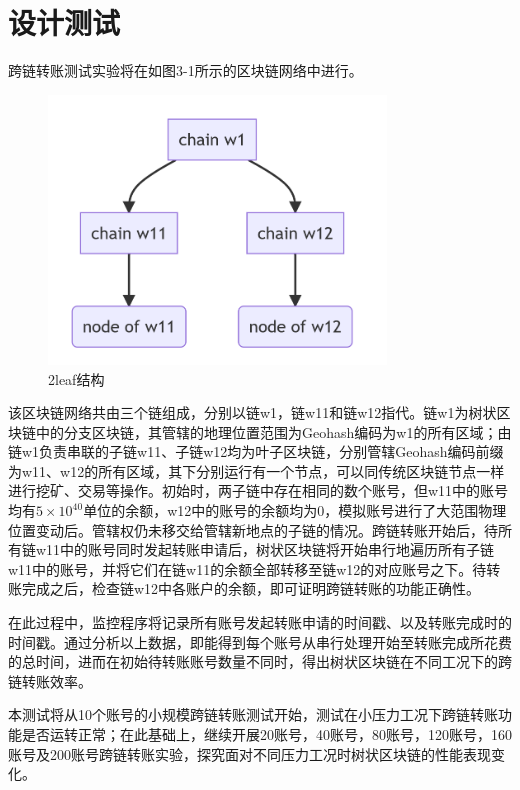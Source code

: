 \section{设计测试}

跨链转账测试实验将在如图3-1所示的区块链网络中进行。

\begin{figure}[htbp]
    \centering
    \includegraphics[width=0.8\textwidth]{images/2leaf-structure.png}
    \caption{2leaf结构}\label{2leaf结构} %
\end{figure}

该区块链网络共由三个链组成，分别以链w1，链w11和链w12指代。链w1为树状区块链中的分支区块链，其管辖的地理位置范围为Geohash编码为w1的所有区域；由链w1负责串联的子链w11、子链w12均为叶子区块链，分别管辖Geohash编码前缀为w11、w12的所有区域，其下分别运行有一个节点，可以同传统区块链节点一样进行挖矿、交易等操作。初始时，两子链中存在相同的数个账号，但w11中的账号均有$5 \times 10^{40}$单位的余额，w12中的账号的余额均为0，模拟账号进行了大范围物理位置变动后。管辖权仍未移交给管辖新地点的子链的情况。跨链转账开始后，待所有链w11中的账号同时发起转账申请后，树状区块链将开始串行地遍历所有子链w11中的账号，并将它们在链w11的余额全部转移至链w12的对应账号之下。待转账完成之后，检查链w12中各账户的余额，即可证明跨链转账的功能正确性。

在此过程中，监控程序将记录所有账号发起转账申请的时间戳、以及转账完成时的时间戳。通过分析以上数据，即能得到每个账号从串行处理开始至转账完成所花费的总时间，进而在初始待转账账号数量不同时，得出树状区块链在不同工况下的跨链转账效率。

本测试将从10个账号的小规模跨链转账测试开始，测试在小压力工况下跨链转账功能是否运转正常；在此基础上，继续开展20账号，40账号，80账号，120账号，160账号及200账号跨链转账实验，探究面对不同压力工况时树状区块链的性能表现变化。

